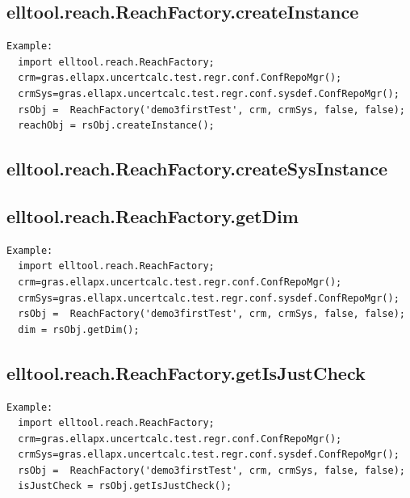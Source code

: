 \documentclass[letterpaper,10pt,english]{sphinxmanual}
\begin{document}
\subsection{elltool.reach.ReachFactory.createInstance}
\label{chap_functions:elltool-reach-reachfactory-createinstance}
\begin{Verbatim}[commandchars=\\\{\}]
Example:
  import elltool.reach.ReachFactory;
  crm=gras.ellapx.uncertcalc.test.regr.conf.ConfRepoMgr();
  crmSys=gras.ellapx.uncertcalc.test.regr.conf.sysdef.ConfRepoMgr();
  rsObj =  ReachFactory('demo3firstTest', crm, crmSys, false, false);
  reachObj = rsObj.createInstance();
\end{Verbatim}


\subsection{elltool.reach.ReachFactory.createSysInstance}
\label{chap_functions:elltool-reach-reachfactory-createsysinstance}

\subsection{elltool.reach.ReachFactory.getDim}
\label{chap_functions:elltool-reach-reachfactory-getdim}
\begin{Verbatim}[commandchars=\\\{\}]
Example:
  import elltool.reach.ReachFactory;
  crm=gras.ellapx.uncertcalc.test.regr.conf.ConfRepoMgr();
  crmSys=gras.ellapx.uncertcalc.test.regr.conf.sysdef.ConfRepoMgr();
  rsObj =  ReachFactory('demo3firstTest', crm, crmSys, false, false);
  dim = rsObj.getDim();
\end{Verbatim}


\subsection{elltool.reach.ReachFactory.getIsJustCheck}
\label{chap_functions:elltool-reach-reachfactory-getisjustcheck}
\begin{Verbatim}[commandchars=\\\{\}]
Example:
  import elltool.reach.ReachFactory;
  crm=gras.ellapx.uncertcalc.test.regr.conf.ConfRepoMgr();
  crmSys=gras.ellapx.uncertcalc.test.regr.conf.sysdef.ConfRepoMgr();
  rsObj =  ReachFactory('demo3firstTest', crm, crmSys, false, false);
  isJustCheck = rsObj.getIsJustCheck();
\end{Verbatim}
\end{document}

